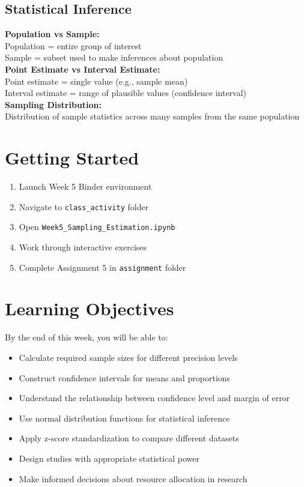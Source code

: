 \documentclass[11pt,a4paper]{article}
\begin{document}
\subsection{Statistical Inference}

\begin{estimationbox}
\textbf{Population vs Sample:}\\
Population = entire group of interest\\
Sample = subset used to make inferences about population\\[0.3cm]
\textbf{Point Estimate vs Interval Estimate:}\\
Point estimate = single value (e.g., sample mean)\\
Interval estimate = range of plausible values (confidence interval)\\[0.3cm]
\textbf{Sampling Distribution:}\\
Distribution of sample statistics across many samples from the same population
\end{estimationbox}

\section{Getting Started}

\begin{enumerate}
    \item Launch Week 5 Binder environment
    \item Navigate to \texttt{class\_activity} folder
    \item Open \texttt{Week5\_Sampling\_Estimation.ipynb}
    \item Work through interactive exercises
    \item Complete Assignment 5 in \texttt{assignment} folder
\end{enumerate}

\section{Learning Objectives}

By the end of this week, you will be able to:
\begin{itemize}
    \item Calculate required sample sizes for different precision levels
    \item Construct confidence intervals for means and proportions
    \item Understand the relationship between confidence level and margin of error
    \item Use normal distribution functions for statistical inference
    \item Apply z-score standardization to compare different datasets
    \item Design studies with appropriate statistical power
    \item Make informed decisions about resource allocation in research
\end{itemize}
\end{document}
